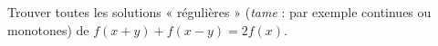 Trouver toutes les solutions « régulières » (\emph{tame} : par exemple continues ou monotones) de $f(x + y) + f(x - y) = 2f(x)$.
